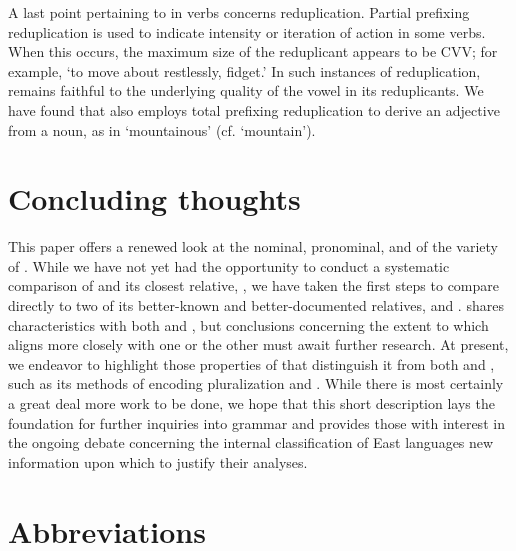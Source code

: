 \documentclass[output=paper]{../langsci/langscibook}
\begin{document}
 A last point pertaining to  in  verbs concerns reduplication. Partial prefixing reduplication is used to indicate intensity or iteration of action in some verbs.  When this occurs, the maximum size of the reduplicant appears to be CVV; for example,  `to move about restlessly, fidget.' In such instances of reduplication,  remains faithful to the underlying quality of the vowel in its reduplicants. We have found that  also employs total prefixing reduplication to derive an adjective from a noun, as in  `mountainous' (cf.  `mountain'). 
 
 \section{Concluding thoughts}
 
 This paper offers a renewed look at the nominal, pronominal, and  of the  variety of . While we have not yet had the opportunity to conduct a systematic comparison of  and its closest relative, , we have taken the first steps to compare  directly to two of its better-known and better-documented relatives,  and .  shares characteristics with both  and , but conclusions concerning the extent to which  aligns more closely with one or the other must await further research. At present, we endeavor to highlight those properties of  that distinguish it from both  and , such as its methods of encoding pluralization and . While there is most certainly a great deal more work to be done, we hope that this short description lays the foundation for further inquiries into  grammar and provides those with interest in the ongoing debate concerning the internal classification of East  languages new information upon which to justify their analyses.
 
\section*{Abbreviations}
\end{document}
